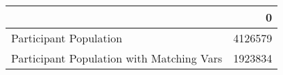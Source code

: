 \begin{tabular}{lr}
\toprule
{} &        0 \\
\midrule
Participant Population                    &  4126579 \\
Participant Population with Matching Vars &  1923834 \\
\bottomrule
\end{tabular}
